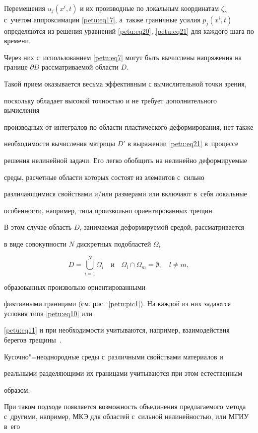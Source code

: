 Перемещения $u_j (x^i,t)$ и их производные по локальным координатам $\zeta _\gamma $ с~учетом аппроксимации \eqref{petu:eq17}, а~также граничные усилия $p_j (x^i,t)$ определяются из решения уравнений \eqref{petu:eq20}, \eqref{petu:eq21} для каждого шага по времени. 

Через них с~использованием \eqref{petu:eq7} могут быть вычислены напряжения на границе $\partial D$ рассматриваемой области $D$.



Такой прием оказывается весьма эффективным с вычислительной точки зрения,

поскольку обладает высокой точностью и не требует дополнительного вычисления

производных от интегралов по области пластического деформирования, нет также

необходимости вычисления матрицы ${D}'$ в выражении \eqref{petu:eq21} в~процессе

решения нелинейной задачи. Его легко обобщить на нелинейно деформируемые

среды, расчетные области которых состоят из элементов с~сильно

различающимися свойствами и/или размерами или включают в~себя локальные

особенности, например, типа произвольно ориентированных трещин.



В этом случае область $D$, занимаемая деформируемой средой, рассматривается

в виде совокупности $N$ дискретных подобластей $\Omega_i$

$$D=\bigcup\limits_{i=1}^N {\Omega _i } \text{ ~~и~~ } \Omega _l \cap \Omega _m

=\emptyset,\quad l\ne m,$$ 

образованных произвольно ориентированными

фиктивными границами (см. рис.~\ref{petu:pic1}). На каждой из них задаются условия типа \eqref{petu:eq10} или

\eqref{petu:eq11} и  при необходимости учитываются, например, взаимодействия берегов трещины~\cite{petu:bib20}.

Кусочно"=неоднородные среды с~различными свойствами материалов и

реальными разделяющими их границами учитываются при этом естественным

образом.



При таком подходе появляется возможность объединения предлагаемого метода с~другими, например, МКЭ для областей с~сильной нелинейностью, или МГИУ в~его

